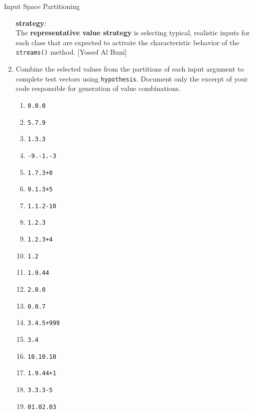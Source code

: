 \documentclass[a4paper]{scrreprt}
\newcounter{question}
\begin{document}
\begin{question}{Input Space Partitioning}
\begin{enumerate}[topsep=0pt, leftmargin=*]
\begin{answer}
\vspace{0.5em}
\noindent
\textbf{strategy}: \\
The \textbf{representative value strategy} is selecting typical, realistic inputs for each class that are expected to activate the characteristic behavior of the \texttt{streams()} method. [Yossef Al Buni]






          \end{answer}

    \item Combine the selected values from the partitions of each input argument to complete test vectors using \texttt{hypothesis}. Document only the excerpt of your code responsible for generation of value combinations.
          \begin{answer}
            \begin{enumerate}
    \item \texttt{0.0.0}
    \item \texttt{5.7.9}
    \item \texttt{1.3.3}
    \item \texttt{-9.-1.-3}
    \item \texttt{1.7.3+0}
    \item \texttt{9.1.3+5}
    \item \texttt{1.1.2-10}
    \item \texttt{1.2.3}    
    \item \texttt{1.2.3+4} 
    \item \texttt{1.2} 
    \item \texttt{1.9.44} 
    \item \texttt{2.0.0} 
    \item \texttt{0.0.7} 
    \item \texttt{3.4.5+999} 
    \item \texttt{3.4} 
    \item \texttt{10.10.10} 
    \item \texttt{1.9.44+1} 
    \item \texttt{3.3.3-5} 
    \item \texttt{01.02.03} 

\end{enumerate}
\end{answer}
\end{enumerate}
\end{question}
\end{document}
